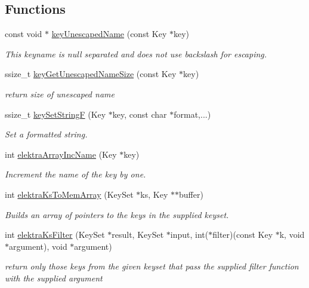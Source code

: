 \subsection*{Functions}
\begin{DoxyCompactItemize}
\item 
const void $\ast$ \hyperlink{group__api_ga6fe6af4c27b35d911a533f4ae4d698bb}{key\-Unescaped\-Name} (const Key $\ast$key)
\begin{DoxyCompactList}\small\item\em This keyname is null separated and does not use backslash for escaping. \end{DoxyCompactList}\item 
ssize\-\_\-t \hyperlink{group__api_ga5e7eff0c77678420199d0d2e8729152b}{key\-Get\-Unescaped\-Name\-Size} (const Key $\ast$key)
\begin{DoxyCompactList}\small\item\em return size of unescaped name \end{DoxyCompactList}\item 
ssize\-\_\-t \hyperlink{group__api_ga812eb6c4f506dafa5733bf531c52199c}{key\-Set\-String\-F} (Key $\ast$key, const char $\ast$format,...)
\begin{DoxyCompactList}\small\item\em Set a formatted string. \end{DoxyCompactList}\item 
int \hyperlink{group__api_gafc46476b8d722d89e07a966e023df317}{elektra\-Array\-Inc\-Name} (Key $\ast$key)
\begin{DoxyCompactList}\small\item\em Increment the name of the key by one. \end{DoxyCompactList}\item 
int \hyperlink{group__api_gac3e995819383f904369c260f212125f5}{elektra\-Ks\-To\-Mem\-Array} (Key\-Set $\ast$ks, Key $\ast$$\ast$buffer)
\begin{DoxyCompactList}\small\item\em Builds an array of pointers to the keys in the supplied keyset. \end{DoxyCompactList}\item 
int \hyperlink{group__api_ga5e727c6d8197f5871a2075454b6214f2}{elektra\-Ks\-Filter} (Key\-Set $\ast$result, Key\-Set $\ast$input, int($\ast$filter)(const Key $\ast$k, void $\ast$argument), void $\ast$argument)
\begin{DoxyCompactList}\small\item\em return only those keys from the given keyset that pass the supplied filter function with the supplied argument \end{DoxyCompactList}\item 
$$
\end{DoxyCompactItemize}
